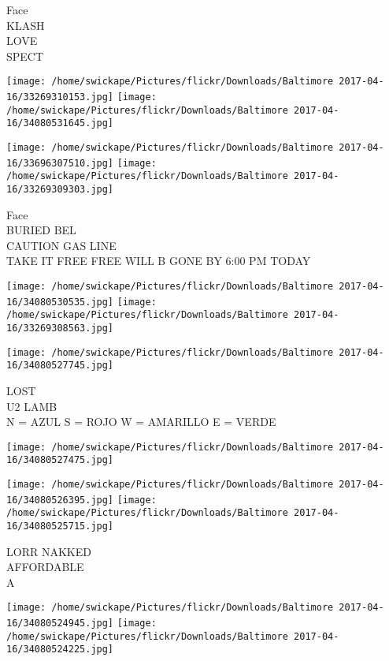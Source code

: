 \documentclass[10pt,letterpaper]{article}
\begin{document}
Face\\
KLASH\\
LOVE\\
SPECT\\
\pagebreak

\texttt{[image: /home/swickape/Pictures/flickr/Downloads/Baltimore 2017-04-16/33269310153.jpg]}
\texttt{[image: /home/swickape/Pictures/flickr/Downloads/Baltimore 2017-04-16/34080531645.jpg]}

\texttt{[image: /home/swickape/Pictures/flickr/Downloads/Baltimore 2017-04-16/33696307510.jpg]}
\texttt{[image: /home/swickape/Pictures/flickr/Downloads/Baltimore 2017-04-16/33269309303.jpg]}

Face\\
BURIED BEL\\
CAUTION GAS LINE\\
TAKE IT FREE FREE WILL B GONE BY 6:00 PM TODAY\\
\pagebreak

\texttt{[image: /home/swickape/Pictures/flickr/Downloads/Baltimore 2017-04-16/34080530535.jpg]}
\texttt{[image: /home/swickape/Pictures/flickr/Downloads/Baltimore 2017-04-16/33269308563.jpg]}

\texttt{[image: /home/swickape/Pictures/flickr/Downloads/Baltimore 2017-04-16/34080527745.jpg]}

LOST\\
U2 LAMB\\
N = AZUL S = ROJO W = AMARILLO E = VERDE\\
\pagebreak

\texttt{[image: /home/swickape/Pictures/flickr/Downloads/Baltimore 2017-04-16/34080527475.jpg]}

\vspace{0.25in}
\texttt{[image: /home/swickape/Pictures/flickr/Downloads/Baltimore 2017-04-16/34080526395.jpg]}
\texttt{[image: /home/swickape/Pictures/flickr/Downloads/Baltimore 2017-04-16/34080525715.jpg]}

LORR NAKKED\\
AFFORDABLE\\
A\\
\pagebreak

\texttt{[image: /home/swickape/Pictures/flickr/Downloads/Baltimore 2017-04-16/34080524945.jpg]}
\texttt{[image: /home/swickape/Pictures/flickr/Downloads/Baltimore 2017-04-16/34080524225.jpg]}
\end{document}
